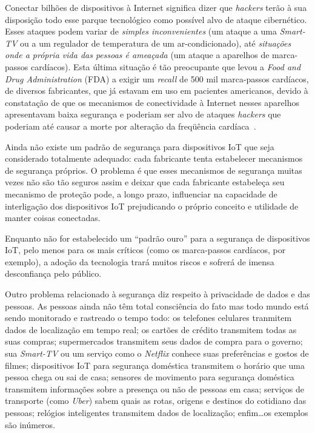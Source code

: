 \documentclass[pdftex, brazil, 12pt, twoside]{article}
\newcommand{\ingles}[1]{\textit{#1}}
\begin{document}
Conectar bilhões de dispositivos à Internet significa dizer que \ingles{hackers}
terão à sua disposição todo esse parque tecnológico como possível alvo de
ataque cibernético. Esses ataques podem variar de \emph{simples inconvenientes} (um
ataque a uma \ingles{Smart-TV} ou a um regulador de temperatura de um ar-condicionado),
até \emph{situações onde a própria vida das pessoas é ameaçada} (um ataque a aparelhos
de marca-passos cardíacos). Esta última situação é tão preocupante que levou a
\ingles{Food and Drug Administration} (FDA) a exigir um \ingles{recall} de 500 mil
marca-passos cardíacos, de diversos fabricantes, que já estavam em uso em pacientes
americanos, devido à constatação de que os mecanismos de conectividade à Internet
nesses aparelhos apresentavam baixa segurança e poderiam ser alvo de ataques
\ingles{hackers} que poderiam até causar a morte por alteração da
freqüência cardíaca~\citep{HernPacemakersIoTRecall2017}.

Ainda não existe um padrão de segurança para dispositivos IoT que seja considerado
totalmente adequado: cada fabricante tenta estabelecer mecanismos de segurança
próprios. O problema é que esses mecanismos de segurança muitas vezes não são
tão seguros assim e deixar que cada fabricante estabeleça seu mecanismo de proteção
pode, a longo prazo, influenciar na capacidade de interligação dos dispositivos IoT
prejudicando o próprio conceito e utilidade de manter coisas conectadas.

Enquanto não for estabelecido um ``padrão ouro'' para a segurança de dispositivos
IoT, pelo menos para os mais críticos (como os marca-passos cardíacos, por
exemplo), a adoção da tecnologia trará muitos riscos e sofrerá de imensa
desconfiança pelo público.

Outro problema relacionado à segurança diz respeito à privacidade de dados e
das pessoas. As pessoas ainda não têm total consciência do fato mas todo mundo
está sendo monitorado e rastreado o tempo todo: os telefones celulares tranmitem
dados de localização em tempo real; os cartões de crédito transmitem todas as
suas compras; supermercados transmitem seus dados de compra para o governo;
sua \ingles{Smart-TV} ou um serviço como o \ingles{Netflix} conhece suas
preferências e gostos de filmes; dispositivos IoT para segurança doméstica
transmitem o horário que uma pessoa chega ou sai de casa; sensores de
movimento para segurança doméstica transmitem informações sobre a presença ou
não de pessoas em casa; serviços de transporte (como \ingles{Uber}) sabem quais
as rotas, origens e destinos do cotidiano das pessoas;
relógios inteligentes transmitem dados de localização;
enfim\ldots os exemplos são inúmeros.
\end{document}
